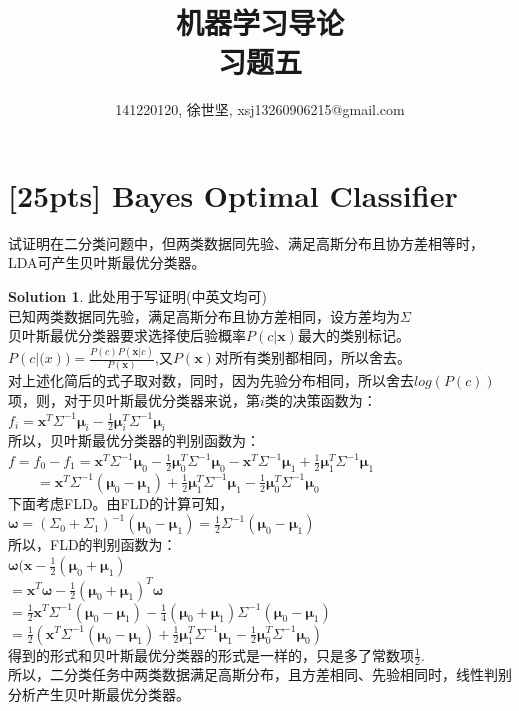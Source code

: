 \documentclass[a4paper,UTF8]{article}
\numberwithin{equation}{section}
\theoremstyle{definition}
\newtheorem*{solution}{Solution}
\begin{document}
\title{机器学习导论\\
习题五}
\author{141220120, 徐世坚, xsj13260906215@gmail.com}
\maketitle
\section{[25pts] Bayes Optimal Classifier}
试证明在二分类问题中，但两类数据同先验、满足高斯分布且协方差相等时，LDA可产生贝叶斯最优分类器。
\begin{solution}
此处用于写证明(中英文均可)\\
已知两类数据同先验，满足高斯分布且协方差相同，设方差均为$\Sigma$\\
贝叶斯最优分类器要求选择使后验概率$P(c|\mathbf{x})$最大的类别标记。\\
$P(c|\mathbf(x))=\frac{P(c)P(\mathbf{x}|c)}{P(\mathbf{x})}$,又$P(\mathbf{x})$对所有类别都相同，所以舍去。\\
对上述化简后的式子取对数，同时，因为先验分布相同，所以舍去$log(P(c))$项，则，对于贝叶斯最优分类器来说，第$i$类的决策函数为：\\
$f_i=\mathbf{x}^T\Sigma^{-1}\mathbf{\mu}_i - \frac{1}{2}\mathbf{\mu}_i^T \Sigma^{-1}\mathbf{\mu}_i$\\
所以，贝叶斯最优分类器的判别函数为：\\
$f=f_0-f_1=\mathbf{x}^T\Sigma^{-1}\mathbf{\mu}_0 - \frac{1}{2}\mathbf{\mu}_0^T \Sigma^{-1}\mathbf{\mu}_0  -  \mathbf{x}^T\Sigma^{-1}\mathbf{\mu}_1 + \frac{1}{2}\mathbf{\mu}_1^T \Sigma^{-1}\mathbf{\mu}_1$\\
$\qquad = \mathbf{x}^T\Sigma^{-1}(\mathbf{\mu}_0-\mathbf{\mu}_1) + \frac{1}{2}\mathbf{\mu}_1^T \Sigma^{-1}\mathbf{\mu}_1 - \frac{1}{2}\mathbf{\mu}_0^T \Sigma^{-1}\mathbf{\mu}_0$\\
下面考虑FLD。由FLD的计算可知，$\mathbf{\omega} = (\Sigma_0 + \Sigma_1)^{-1}(\mathbf{\mu}_0 - \mathbf{\mu}_1) = \frac{1}{2}\Sigma^{-1}(\mathbf{\mu}_0 - \mathbf{\mu}_1)$\\
所以，FLD的判别函数为：\\
$\mathbf{\omega}(\mathbf{x}- \frac{1}{2}(\mathbf{\mu}_0 + \mathbf{\mu}_1)$\\
$=\mathbf{x}^T\mathbf{\omega} - \frac{1}{2}(\mathbf{\mu}_0 + \mathbf{\mu}_1)^T\mathbf{\omega}$\\
$=\frac{1}{2}\mathbf{x}^T\Sigma^{-1}(\mathbf{\mu}_0 - \mathbf{\mu}_1) - \frac{1}{4} (\mathbf{\mu}_0 + \mathbf{\mu}_1) \Sigma^{-1} (\mathbf{\mu}_0 - \mathbf{\mu}_1)$\\
$=\frac{1}{2} (\mathbf{x}^T\Sigma^{-1}(\mathbf{\mu}_0-\mathbf{\mu}_1) + \frac{1}{2}\mathbf{\mu}_1^T \Sigma^{-1}\mathbf{\mu}_1 - \frac{1}{2}\mathbf{\mu}_0^T \Sigma^{-1}\mathbf{\mu}_0)$\\
得到的形式和贝叶斯最优分类器的形式是一样的，只是多了常数项$\frac{1}{2}$.\\
所以，二分类任务中两类数据满足高斯分布，且方差相同、先验相同时，线性判别分析产生贝叶斯最优分类器。\\
\end{solution}
\end{document}
